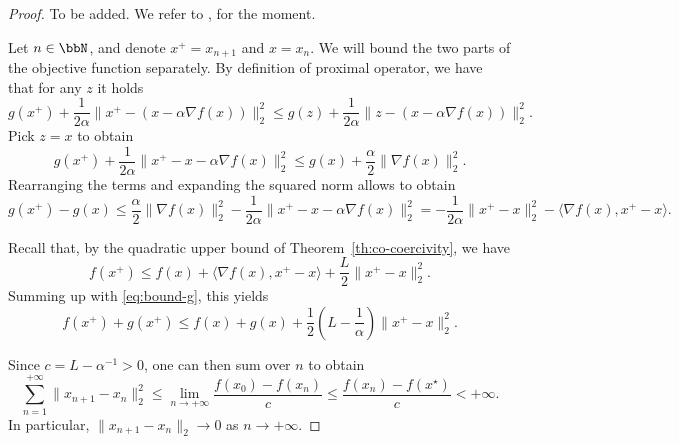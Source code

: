      \begin{proof}
         To be added. We refer to \cite{fawziLecture}, for the moment.
 
         Let $n\in\bbN$, and denote $x^+=x_{n+1}$ and $x=x_n$.
         We will bound the two parts of the objective function separately.
         By definition of proximal operator, we have that for any $z$ it holds
         \begin{equation}
             g(x^+) + \frac{1}{2\alpha}\|x^+-(x - \alpha \nabla f(x))\|_2^2
             \le g(z) + \frac{1}{2\alpha}\|z-(x - \alpha \nabla f(x))\|_2^2.
         \end{equation}
         Pick $z=x$ to obtain
         \begin{equation}
             g(x^+) + \frac{1}{2\alpha}\|x^+-x - \alpha \nabla f(x)\|_2^2
             \le g(x) + \frac{\alpha}{2}\|\nabla f(x)\|_2^2.
         \end{equation}
         Rearranging the terms and expanding the squared norm allows to obtain
         \begin{equation}
             \label{eq:bound-g}
             g(x^+) - g(x)
             \le\frac{\alpha}{2}\|\nabla f(x)\|_2^2 - \frac{1}{2\alpha}\|x^+-x - \alpha \nabla f(x)\|_2^2
             = -\frac{1}{2\alpha} \|x^+-x\|_2^2 -\langle \nabla f(x),x^+-x\rangle.
         \end{equation}
 
 
         Recall that, by the quadratic upper bound of Theorem~\ref{th:co-coercivity}, we have
         \begin{equation}
             f(x^+) \le f(x) + \langle\nabla f(x),x^+-x\rangle + \frac{L}{2}\|x^+-x\|_2^2.
         \end{equation}
         Summing up with \eqref{eq:bound-g}, this yields
         \begin{equation}
             f(x^+)+g(x^+) \le f(x)+g(x) +\frac{1}2\left(L-\frac1\alpha\right) \|x^+-x\|_2^2.
         \end{equation}
 
         Since $c=L-\alpha^{-1}>0$, one can then sum over $n$ to obtain
         \begin{equation}
             \sum_{n=1}^{+\infty}\|x_{n+1}-x_n\|_2^2  \le \lim_{n\to+\infty} \frac{f(x_0)-f(x_n)}{c} \le\frac{f(x_n)-f(x^\star)}{c}  <+\infty.
         \end{equation}
         In particular, $\|x_{n+1}-x_n\|_2\rightarrow 0$ as $n\to +\infty$.
 

\end{proof}
